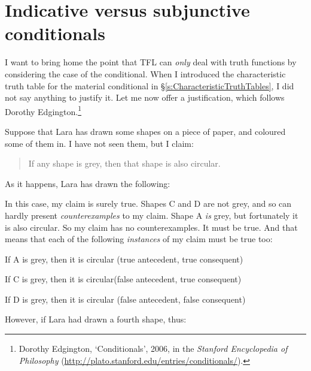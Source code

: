 \section{Indicative versus subjunctive conditionals}\label{s:IndicativeSubjunctive}
I want to bring home the point that TFL can \emph{only} deal with truth functions by considering the case of the conditional. When I introduced the characteristic truth table for the material conditional in \S\ref{s:CharacteristicTruthTables}, I did not say anything to justify it. Let me now offer a justification, which follows Dorothy Edgington.\footnote{Dorothy Edgington, `Conditionals', 2006, in the \emph{Stanford Encyclopedia of Philosophy} (\url{http://plato.stanford.edu/entries/conditionals/}).} 

Suppose that Lara has drawn some shapes on a piece of paper, and coloured some of them in. I have not seen them, but I claim:
	\begin{quote}
		If any shape is grey, then that shape is also circular.
	\end{quote}
As it happens, Lara has drawn the following:
\begin{center}
\end{center}
In this case, my claim is surely true.  Shapes C and D are not grey, and so can hardly present \emph{counterexamples} to my claim. Shape A \emph{is} grey, but fortunately it is also circular. So my claim has no counterexamples. It must be true. And that means that each of the following \emph{instances} of my claim must be true too:
	\begin{ebullet}
		\item If A is grey, then it is circular \hfill (true antecedent, true consequent)
		\item If C is grey, then it is circular\hfill (false antecedent, true consequent)
		\item If D is grey, then it is circular \hfill (false antecedent, false consequent)
	\end{ebullet}
However, if Lara had drawn a fourth shape, thus:
\begin{center}
\end{center}
